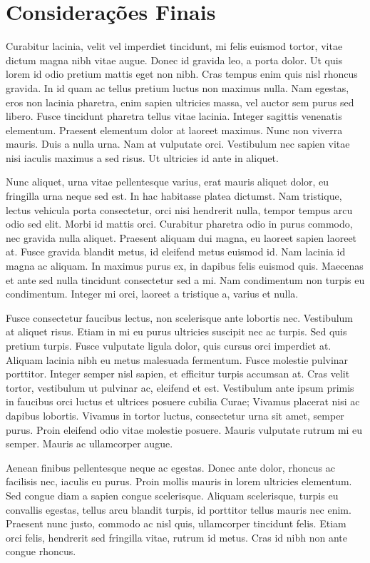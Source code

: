 \chapter[Considerações Finais]{Considerações Finais}

Curabitur lacinia, velit vel imperdiet tincidunt, mi felis euismod tortor, vitae dictum magna nibh vitae augue. Donec id gravida leo, a porta dolor. Ut quis lorem id odio pretium mattis eget non nibh. Cras tempus enim quis nisl rhoncus gravida. In id quam ac tellus pretium luctus non maximus nulla. Nam egestas, eros non lacinia pharetra, enim sapien ultricies massa, vel auctor sem purus sed libero. Fusce tincidunt pharetra tellus vitae lacinia. Integer sagittis venenatis elementum. Praesent elementum dolor at laoreet maximus. Nunc non viverra mauris. Duis a nulla urna. Nam at vulputate orci. Vestibulum nec sapien vitae nisi iaculis maximus a sed risus. Ut ultricies id ante in aliquet.

Nunc aliquet, urna vitae pellentesque varius, erat mauris aliquet dolor, eu fringilla urna neque sed est. In hac habitasse platea dictumst. Nam tristique, lectus vehicula porta consectetur, orci nisi hendrerit nulla, tempor tempus arcu odio sed elit. Morbi id mattis orci. Curabitur pharetra odio in purus commodo, nec gravida nulla aliquet. Praesent aliquam dui magna, eu laoreet sapien laoreet at. Fusce gravida blandit metus, id eleifend metus euismod id. Nam lacinia id magna ac aliquam. In maximus purus ex, in dapibus felis euismod quis. Maecenas et ante sed nulla tincidunt consectetur sed a mi. Nam condimentum non turpis eu condimentum. Integer mi orci, laoreet a tristique a, varius et nulla.

Fusce consectetur faucibus lectus, non scelerisque ante lobortis nec. Vestibulum at aliquet risus. Etiam in mi eu purus ultricies suscipit nec ac turpis. Sed quis pretium turpis. Fusce vulputate ligula dolor, quis cursus orci imperdiet at. Aliquam lacinia nibh eu metus malesuada fermentum. Fusce molestie pulvinar porttitor. Integer semper nisl sapien, et efficitur turpis accumsan at. Cras velit tortor, vestibulum ut pulvinar ac, eleifend et est. Vestibulum ante ipsum primis in faucibus orci luctus et ultrices posuere cubilia Curae; Vivamus placerat nisi ac dapibus lobortis. Vivamus in tortor luctus, consectetur urna sit amet, semper purus. Proin eleifend odio vitae molestie posuere. Mauris vulputate rutrum mi eu semper. Mauris ac ullamcorper augue.

Aenean finibus pellentesque neque ac egestas. Donec ante dolor, rhoncus ac facilisis nec, iaculis eu purus. Proin mollis mauris in lorem ultricies elementum. Sed congue diam a sapien congue scelerisque. Aliquam scelerisque, turpis eu convallis egestas, tellus arcu blandit turpis, id porttitor tellus mauris nec enim. Praesent nunc justo, commodo ac nisl quis, ullamcorper tincidunt felis. Etiam orci felis, hendrerit sed fringilla vitae, rutrum id metus. Cras id nibh non ante congue rhoncus.

